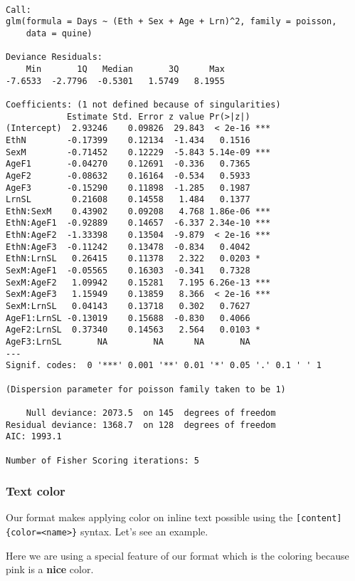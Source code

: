 \documentclass[
]{aft}
\begin{document}
\begin{verbatim}

Call:
glm(formula = Days ~ (Eth + Sex + Age + Lrn)^2, family = poisson, 
    data = quine)

Deviance Residuals: 
    Min       1Q   Median       3Q      Max  
-7.6533  -2.7796  -0.5301   1.5749   8.1955  

Coefficients: (1 not defined because of singularities)
            Estimate Std. Error z value Pr(>|z|)    
(Intercept)  2.93246    0.09826  29.843  < 2e-16 ***
EthN        -0.17399    0.12134  -1.434   0.1516    
SexM        -0.71452    0.12229  -5.843 5.14e-09 ***
AgeF1       -0.04270    0.12691  -0.336   0.7365    
AgeF2       -0.08632    0.16164  -0.534   0.5933    
AgeF3       -0.15290    0.11898  -1.285   0.1987    
LrnSL        0.21608    0.14558   1.484   0.1377    
EthN:SexM    0.43902    0.09208   4.768 1.86e-06 ***
EthN:AgeF1  -0.92889    0.14657  -6.337 2.34e-10 ***
EthN:AgeF2  -1.33398    0.13504  -9.879  < 2e-16 ***
EthN:AgeF3  -0.11242    0.13478  -0.834   0.4042    
EthN:LrnSL   0.26415    0.11378   2.322   0.0203 *  
SexM:AgeF1  -0.05565    0.16303  -0.341   0.7328    
SexM:AgeF2   1.09942    0.15281   7.195 6.26e-13 ***
SexM:AgeF3   1.15949    0.13859   8.366  < 2e-16 ***
SexM:LrnSL   0.04143    0.13718   0.302   0.7627    
AgeF1:LrnSL -0.13019    0.15688  -0.830   0.4066    
AgeF2:LrnSL  0.37340    0.14563   2.564   0.0103 *  
AgeF3:LrnSL       NA         NA      NA       NA    
---
Signif. codes:  0 '***' 0.001 '**' 0.01 '*' 0.05 '.' 0.1 ' ' 1

(Dispersion parameter for poisson family taken to be 1)

    Null deviance: 2073.5  on 145  degrees of freedom
Residual deviance: 1368.7  on 128  degrees of freedom
AIC: 1993.1

Number of Fisher Scoring iterations: 5
\end{verbatim}

\hypertarget{sec-summary}{%
\subsubsection{Text color}\label{sec-summary}}

Our format makes applying color on inline text possible using the
\texttt{{[}content{]}\{color=\textless{}name\textgreater{}\}} syntax.
Let's see an example.

Here we are using a special feature of our format which is the coloring
because \textcolor{mypink}{pink is a \textbf{nice} color}.
\end{document}
